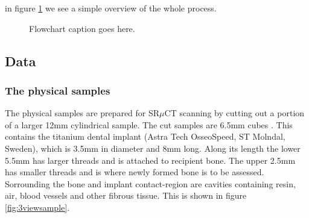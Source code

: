 in figure \ref{fig:flowchart} we see a simple overview of the whole process.
      
\begin{figure}[!h]
\centering
{}
\caption{Flowchart caption goes here.}
\label{fig:flowchart}
\end{figure}


\subsection*{Data}

\subsubsection*{The physical samples}

The physical samples are prepared for SR$\mu$CT scanning by cutting out a portion of a larger
12mm cylindrical sample.  The cut samples are 6.5mm cubes . This contains the titanium dental implant (Astra Tech OsseoSpeed, ST Molndal, Sweden), which is 3.5mm in diameter and 8mm long. Along its length the lower 5.5mm has larger threads and is attached to recipient bone. The upper 2.5mm has smaller threads and is where newly formed bone is to be assessed. Sorrounding the bone and implant contact-region are cavities containing resin, air, blood vessels and other fibrous tissue. This is shown in figure \ref{fig:3viewsample}.


